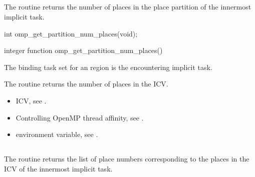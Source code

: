 \subsection{}
\label{subsec:omp_get_partition_num_places}

\summary
The  routine returns the number of places in the place partition of the innermost implicit task.

\format
\ccppspecificstart
\begin{boxedcode}
int omp\_get\_partition\_num\_places(void);
\end{boxedcode}
\ccppspecificend

\fortranspecificstart
\begin{boxedcode}
integer function omp\_get\_partition\_num\_places()
\end{boxedcode}
\fortranspecificend

\binding
The binding task set for an   region is the encountering implicit task.

\effect
The  routine returns the number of places in the  ICV.

\crossreferences
\begin{itemize}
\item {} ICV, see 
.

\item Controlling OpenMP thread affinity, see 
. 

\item {} environment variable, see 
.
\end{itemize}





\subsection{}
\label{subsec:omp_get_partition_place_nums}

\summary
The  routine returns the list of place numbers corresponding to the places in the  ICV of the innermost implicit task.

